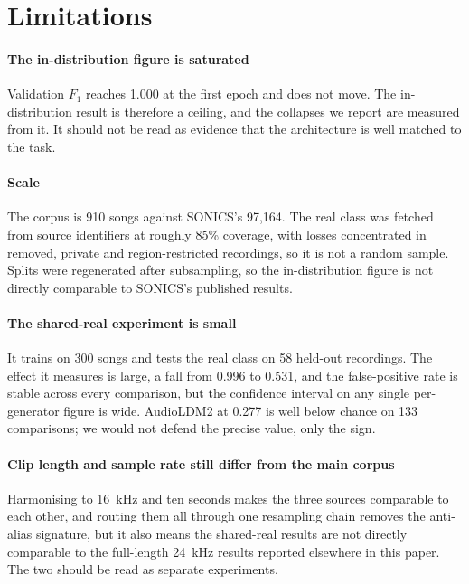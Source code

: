 \section{Limitations}
\label{sec:limitations}

\paragraph{The in-distribution figure is saturated}
Validation $F_1$ reaches 1.000 at the first epoch and does not move. The
in-distribution result is therefore a ceiling, and the collapses we report are
measured from it. It should not be read as evidence that the architecture is
well matched to the task.

\paragraph{Scale}
The corpus is 910 songs against SONICS's 97{,}164. The real class was fetched
from source identifiers at roughly 85\% coverage, with losses concentrated in
removed, private and region-restricted recordings, so it is not a random sample.
Splits were regenerated after subsampling, so the in-distribution figure is not
directly comparable to SONICS's published results.

\paragraph{The shared-real experiment is small}
It trains on 300 songs and tests the real class on 58 held-out recordings. The
effect it measures is large, a fall from 0.996 to 0.531, and the false-positive
rate is stable across every comparison, but the confidence interval on any
single per-generator figure is wide. AudioLDM2 at 0.277 is well below chance on
133 comparisons; we would not defend the precise value, only the sign.

\paragraph{Clip length and sample rate still differ from the main corpus}
Harmonising to \SI{16}{\kilo\hertz} and ten seconds makes the three sources
comparable to each other, and routing them all through one resampling chain
removes the anti-alias signature, but it also means the shared-real results are
not directly comparable to the full-length \SI{24}{\kilo\hertz} results
reported elsewhere in this paper. The two should be read as separate
experiments.

